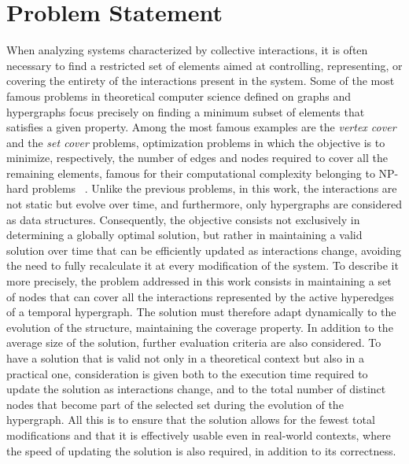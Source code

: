 
\section{Problem Statement}\label{sec:problem_statement}

When analyzing systems characterized by collective interactions, it is often necessary to find a restricted set of elements aimed at controlling, representing, or covering the entirety of the interactions present in the system.
Some of the most famous problems in theoretical computer science defined on graphs and hypergraphs focus precisely on finding a minimum subset of elements that satisfies a given property. Among the most famous examples are the \textit{vertex cover} and the \textit{set cover} problems, optimization problems in which the objective is to minimize, respectively, the number of edges and nodes required to cover all the remaining elements, famous for their computational complexity belonging to NP-hard problems ~\cite{gomes2006}.
Unlike the previous problems, in this work, the interactions are not static but evolve over time, and furthermore, only hypergraphs are considered as data structures.
Consequently, the objective consists not exclusively in determining a globally optimal solution, but rather in maintaining a valid solution over time that can be efficiently updated as interactions change, avoiding the need to fully recalculate it at every modification of the system.
To describe it more precisely, the problem addressed in this work consists in maintaining a set of nodes that can cover all the interactions represented by the active hyperedges of a temporal hypergraph.
The solution must therefore adapt dynamically to the evolution of the structure, maintaining the coverage property.
In addition to the average size of the solution, further evaluation criteria are also considered.
To have a solution that is valid not only in a theoretical context but also in a practical one, consideration is given both to the execution time required to update the solution as interactions change, and to the total number of distinct nodes that become part of the selected set during the evolution of the hypergraph.
All this is to ensure that the solution allows for the fewest total modifications and that it is effectively usable even in real-world contexts, where the speed of updating the solution is also required, in addition to its correctness.

